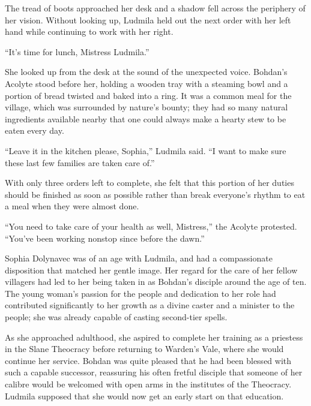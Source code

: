  

The tread of boots approached her desk and a shadow fell across the periphery of her vision. Without looking up, Ludmila held out the next order with her left hand while continuing to work with her right.

 

“It’s time for lunch, Mistress Ludmila.”

 

She looked up from the desk at the sound of the unexpected voice. Bohdan’s Acolyte stood before her, holding a wooden tray with a steaming bowl and a portion of bread twisted and baked into a ring. It was a common meal for the village, which was surrounded by nature’s bounty; they had so many natural ingredients available nearby that one could always make a hearty stew to be eaten every day.

 

“Leave it in the kitchen please, Sophia,” Ludmila said. “I want to make sure these last few families are taken care of.”

 

With only three orders left to complete, she felt that this portion of her duties should be finished as soon as possible rather than break everyone’s rhythm to eat a meal when they were almost done.

 

“You need to take care of your health as well, Mistress,” the Acolyte protested. “You’ve been working nonstop since before the dawn.”

 

Sophia Dolynavec was of an age with Ludmila, and had a compassionate disposition that matched her gentle image. Her regard for the care of her fellow villagers had led to her being taken in as Bohdan’s disciple around the age of ten. The young woman’s passion for the people and dedication to her role had contributed significantly to her growth as a divine caster and a minister to the people; she was already capable of casting second-tier spells.

 

As she approached adulthood, she aspired to complete her training as a priestess in the Slane Theocracy before returning to Warden’s Vale, where she would continue her service. Bohdan was quite pleased that he had been blessed with such a capable successor, reassuring his often fretful disciple that someone of her calibre would be welcomed with open arms in the institutes of the Theocracy. Ludmila supposed that she would now get an early start on that education.

